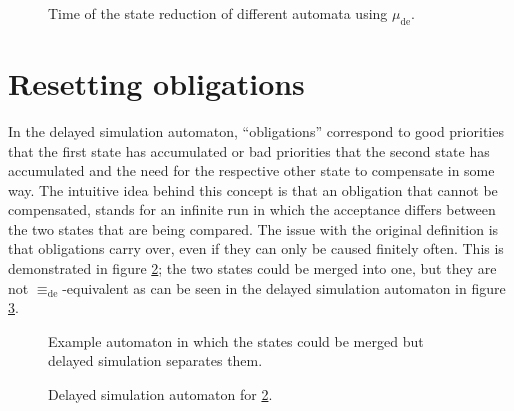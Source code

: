 \begin{figure}
\begin{minipage}{0.49\textwidth}
		\caption{Time of the state reduction of different automata using $\mu_\text{de}$.}
		\label{fig:fritzwilke:empirical_runtime}
	\end{minipage}
\end{figure}





\section{Resetting obligations} 
In the delayed simulation automaton, \enquote{obligations} correspond to good priorities that the first state has accumulated or bad priorities that the second state has accumulated and the need for the respective other state to compensate in some way. The intuitive idea behind this concept is that an obligation that cannot be compensated, stands for an infinite run in which the acceptance differs between the two states that are being compared. The issue with the original definition is that obligations carry over, even if they can only be caused finitely often. This is demonstrated in figure \ref{fig:fritzwilke:reset_oblig_example}; the two states could be merged into one, but they are not $\equiv_\text{de}$-equivalent as can be seen in the delayed simulation automaton in figure \ref{fig:fritzwilke:reset_oblig_example_dea}.

\begin{figure}
\centering
{}
\caption{Example automaton in which the states could be merged but delayed simulation separates them.}
\label{fig:fritzwilke:reset_oblig_example}
\end{figure}

\begin{figure}
\centering
{}
\caption{Delayed simulation automaton for \ref{fig:fritzwilke:reset_oblig_example}.}
\label{fig:fritzwilke:reset_oblig_example_dea}
\end{figure}

